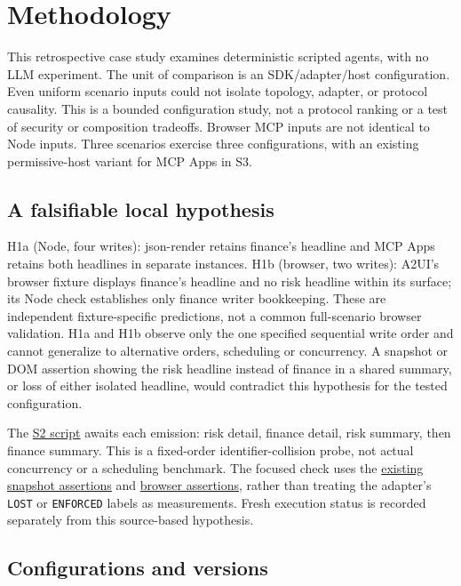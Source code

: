 \documentclass[11pt]{article}
\begin{document}
\section{Methodology}\label{methodology}

This retrospective case study examines deterministic scripted agents,
with no LLM experiment. The unit of comparison is an SDK/adapter/host
configuration. Even uniform scenario inputs could not isolate topology,
adapter, or protocol causality. This is a bounded configuration study,
not a protocol ranking or a test of security or composition tradeoffs.
Browser MCP inputs are not identical to Node inputs. Three scenarios
exercise three configurations, with an existing permissive-host variant
for MCP Apps in S3.

\subsection{A falsifiable local
hypothesis}\label{a-falsifiable-local-hypothesis}

H1a (Node, four writes): json-render retains finance's headline and MCP
Apps retains both headlines in separate instances. H1b (browser, two
writes): A2UI's browser fixture displays finance's headline and no risk
headline within its surface; its Node check establishes only finance
writer bookkeeping. These are independent fixture-specific predictions,
not a common full-scenario browser validation. H1a and H1b observe only
the one specified sequential write order and cannot generalize to
alternative orders, scheduling or concurrency. A snapshot or DOM
assertion showing the risk headline instead of finance in a shared
summary, or loss of either isolated headline, would contradict this
hypothesis for the tested configuration.

The \href{../src/scenarios/s2-fixed-order-collision.ts}{S2 script}
awaits each emission: risk detail, finance detail, risk summary, then
finance summary. This is a fixed-order identifier-collision probe, not
actual concurrency or a scheduling benchmark. The focused check uses the
\href{../tests/protocol/scenarios.test.ts}{existing snapshot assertions}
and \href{../tests/browser/render.spec.ts}{browser assertions}, rather
than treating the adapter's \texttt{LOST} or \texttt{ENFORCED} labels as
measurements. Fresh execution status is recorded separately from this
source-based hypothesis.

\subsection{Configurations and
versions}\label{configurations-and-versions}
\end{document}
